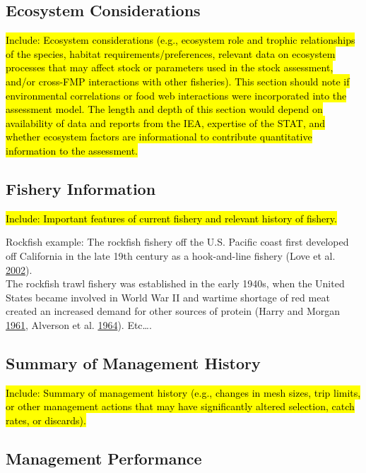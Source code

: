 \documentclass[12pt,]{article}
\begin{document}
\subsection{Ecosystem Considerations}\label{ecosystem-considerations-1}

\hl{Include: Ecosystem considerations (e.g., ecosystem role and trophic relationships of 
the species, habitat requirements/preferences, relevant data on ecosystem processes 
that may affect stock or parameters used in the stock assessment, and/or cross-FMP 
interactions with other fisheries). This section should note if environmental 
correlations or food web interactions were incorporated into the assessment model. 
The length and depth of this section would depend on availability of data and reports 
from the IEA, expertise of the STAT, and whether ecosystem factors are informational 
to contribute quantitative information to the assessment.}

\subsection{Fishery Information}\label{fishery-information}

\hl{Include: Important features of current fishery and relevant history of fishery.}

Rockfish example: The rockfish fishery off the U.S. Pacific coast first
developed off California in the late 19th century as a hook-and-line
fishery (Love et al. \protect\hyperlink{ref-Love2002}{2002}).\\
The rockfish trawl fishery was established in the early 1940s, when the
United States became involved in World War II and wartime shortage of
red meat created an increased demand for other sources of protein (Harry
and Morgan \protect\hyperlink{ref-Harry1961}{1961}, Alverson et al.
\protect\hyperlink{ref-Alverson1964}{1964}). Etc\ldots{}.

\subsection{Summary of Management
History}\label{summary-of-management-history}

\hl{Include: Summary of management history (e.g., changes in mesh sizes, trip 
limits, or other management actions that may have significantly altered selection, 
catch rates, or discards).}

\subsection{Management Performance}\label{management-performance-1}
\end{document}
